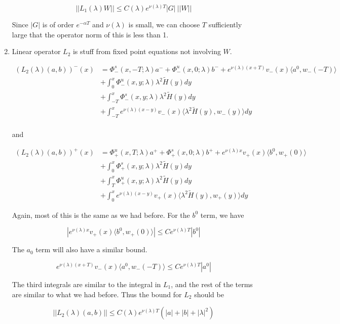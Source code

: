 \documentclass[12pt]{article}
\begin{document}
\begin{enumerate}
\[
||L_1(\lambda)W|| \leq C(\lambda) e^{\nu(\lambda)T} |G| \: ||W||
\]

Since $|G|$ is of order $e^{-\alpha T}$ and $\nu(\lambda)$ is small, we can choose $T$ sufficiently large that the operator norm of this is less than 1.

\item Linear operator $L_2$ is stuff from fixed point equations not involving $W$.


\begin{align*}
(L_2(\lambda)(a,b))^-(x) &= \Phi^s_-(x, -T; \lambda)a^- + \Phi^u_-(x, 0; \lambda)b^- + e^{\nu(\lambda)(x+T)} v_-(x) \langle a^0, w_-(-T) \rangle \\
&+ \int_0^x \Phi^u_-(x, y; \lambda) \lambda^2 \tilde{H}(y) dy \\
&+ \int_{-T}^x \Phi^s_-(x, y; \lambda) \lambda^2 \tilde{H}(y) dy \\
&+ \int_{-T}^x 
e^{\nu(\lambda)(x-y)} v_-(x) \langle \lambda^2 \tilde{H}(y), w_-(y) \rangle dy \\
\end{align*}

and

\begin{align*}
(L_2(\lambda)(a,b))^+(x) &= \Phi^u_+(x, T; \lambda)a^+ + \Phi^s_+(x, 0; \lambda)b^+ + e^{\nu(\lambda)x} v_+(x) \langle b^0, w_+(0) \rangle \\
&+ \int_0^x \Phi^s_+(x, y; \lambda) \lambda^2 \tilde{H}(y) dy \\
&+ \int_T^x \Phi^u_+(x, y; \lambda) \lambda^2 \tilde{H}(y) dy \\
&+ \int_0^x e^{\nu(\lambda)(x-y)} v_+(x) \langle \lambda^2 \tilde{H}(y), w_+(y) \rangle dy
\end{align*}

Again, most of this is the same as we had before. For the $b^0$ term, we have 

\[
|e^{\nu(\lambda)x} v_+(x) \langle b^0, w_+(0) \rangle| \leq C e^{\nu(\lambda)T}|b^0| 
\]

The $a_0$ term will also have a similar bound. 

\[
e^{\nu(\lambda)(x+T)} v_-(x) \langle a^0, w_-(-T) \rangle \leq C e^{\nu(\lambda)T}|a^0|
\]

The third integrals are similar to the integral in $L_1$, and the rest of the terms are similar to what we had before. Thus the bound for $L_2$ should be

\[
||L_2(\lambda)(a,b)|| \leq C(\lambda) e^{\nu(\lambda)T} (|a| + |b| + |\lambda|^2)
\]


\end{enumerate}
\end{document}
